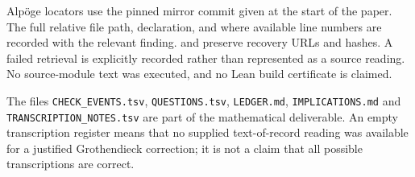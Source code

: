 Alp\"oge locators use the pinned mirror commit given at the start
of the paper. The full relative file path, declaration, and where
available line numbers are recorded with the relevant finding.
 and
 preserve recovery
URLs and hashes. A failed retrieval is explicitly recorded rather
than represented as a source reading. No source-module text was
executed, and no Lean build certificate is claimed.

The files \texttt{CHECK\_EVENTS.tsv}, \texttt{QUESTIONS.tsv},
\texttt{LEDGER.md}, \texttt{IMPLICATIONS.md} and
\texttt{TRANSCRIPTION\_NOTES.tsv} are part of the mathematical
deliverable. An empty transcription register means that no
supplied text-of-record reading was available for a justified
Grothendieck correction; it is not a claim that all possible
transcriptions are correct.
